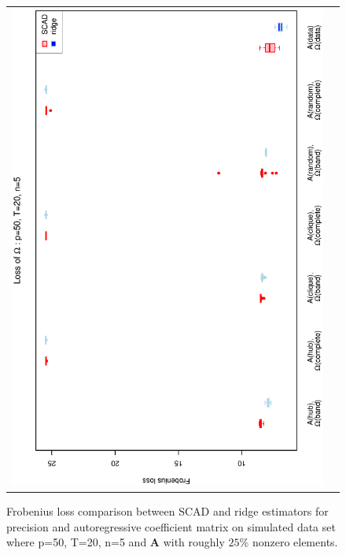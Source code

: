 \documentclass[a4paper]{article}
\begin{document}
\begin{figure}[h!]
\begin{tabular}{cc}
\includegraphics[scale=0.45,angle=270]{LossOmega50T20N5_25.eps}
\end{tabular}
\caption{Frobenius loss comparison between SCAD and ridge estimators for precision and autoregressive coefficient matrix on simulated data set where p=50, T=20, n=5 and $\mathbf{A}$ with roughly $25\%$ nonzero elements.}
\label{figSM:Loss50T20N5_25}
\end{figure}

\end{document}
